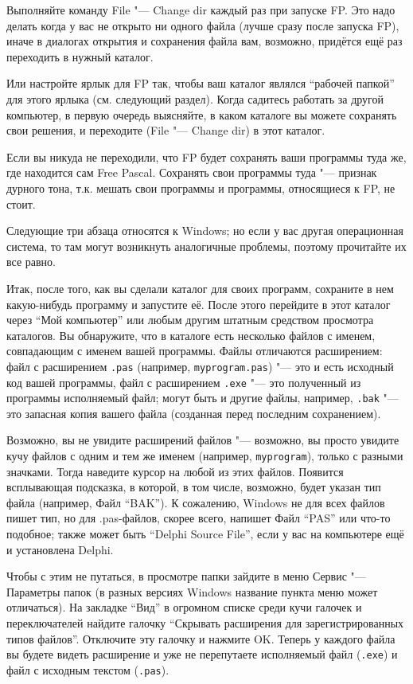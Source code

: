 Выполняйте команду File "--- Change dir каждый раз при запуске FP. Это надо делать когда у вас не 
открыто ни одного файла (лучше сразу после запуска FP), иначе в диалогах открытия и сохранения 
файла вам, возможно, придётся ещё раз переходить в нужный каталог.

Или настройте ярлык для FP так, 
чтобы ваш каталог являлся ``рабочей папкой'' для этого ярлыка (см. следующий раздел). Когда 
садитесь работать за другой компьютер, в первую очередь выясняйте, в каком каталоге вы можете 
сохранять свои решения, и переходите (File "--- Change dir) в этот каталог.

Если вы никуда не переходили, что FP будет сохранять ваши программы туда же, где находится сам Free 
Pascal. Сохранять свои программы туда "--- признак дурного тона, т.к. мешать свои программы и 
программы, относящиеся к FP, не стоит.

Следующие три абзаца относятся к Windows; но если у вас другая операционная система, то там могут 
возникнуть аналогичные проблемы, поэтому прочитайте их все равно.

Итак, после того, как вы сделали каталог для своих программ, сохраните в нем какую-нибудь программу 
и запустите её. После этого перейдите в этот каталог через ``Мой компьютер'' или любым другим 
штатным средством просмотра каталогов. Вы обнаружите, что в каталоге есть несколько файлов с 
именем, совпадающим с именем вашей программы. Файлы отличаются расширением: файл с расширением 
\verb`.pas` (например, \verb`myprogram.pas`) "--- это и есть исходный код вашей программы, файл с 
расширением \verb`.exe` "--- это полученный из программы исполняемый файл; могут быть и другие 
файлы, например, \verb`.bak` "--- это запасная копия вашего файла (созданная перед последним 
сохранением).

Возможно, вы не увидите расширений файлов "--- возможно, вы просто увидите кучу файлов с одним и 
тем же именем (например, \verb`myprogram`), только с разными значками. Тогда наведите курсор на 
любой из этих файлов. Появится всплывающая подсказка, в которой, в том числе, возможно, будет 
указан тип файла (например, Файл  ``BAK''). К сожалению, Windows не для всех файлов пишет тип, но 
для .pas-файлов, скорее всего,  напишет Файл ``PAS'' или что-то подобное; также может быть ``Delphi 
Source File'', если у вас на компьютере ещё и установлена Delphi.

Чтобы с этим не путаться, в просмотре папки зайдите в меню Сервис "--- Параметры папок (в разных 
версиях Windows название пункта меню может отличаться). На закладке ``Вид'' в огромном списке среди 
кучи галочек и переключателей найдите галочку ``Скрывать расширения для зарегистрированных типов 
файлов''. Отключите эту галочку и нажмите OK. Теперь у каждого файла вы будете видеть расширение и 
уже не перепутаете исполняемый файл (\verb`.exe`) и файл с исходным текстом (\verb`.pas`).

